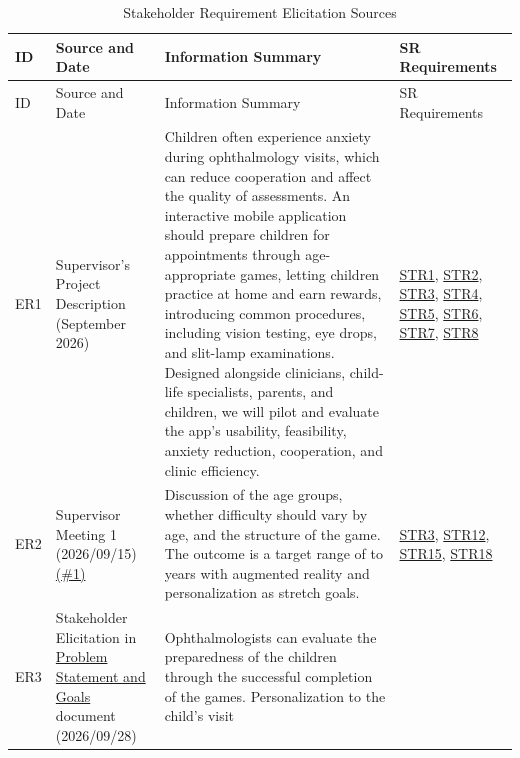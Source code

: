 \documentclass[12pt]{article}
\newcommand{\constref}[1]{%
    \hyperref[const:#1]{\texttt{\detokenize{#1}}}%
}
\begin{document}
\begin{longtable}{p{} >{\raggedright\arraybackslash}p{} >{\raggedright\arraybackslash}p{} >{\raggedright\arraybackslash}p{}}

\caption{Stakeholder Requirement Elicitation Sources}
\label{tab:SRESources}\\

\toprule
ID & Source and Date & Information Summary & SR Requirements \\
\midrule
\endfirsthead

\toprule
ID & Source and Date & Information Summary & SR Requirements \\
\midrule
\endhead

ER1\label{ER1}
& Supervisor's Project Description (September 2026)
& Children often experience anxiety during ophthalmology visits, 
which can reduce cooperation and affect the quality of assessments. 
An interactive mobile application should prepare children for 
appointments through age-appropriate games, letting children practice 
at home and earn rewards, introducing common procedures, including 
vision testing, eye drops, and slit-lamp examinations. Designed alongside 
clinicians, child-life specialists, parents, and children, we will pilot 
and evaluate the app's usability, feasibility, anxiety reduction, 
cooperation, and clinic efficiency.
& \hyperref[SR_Label1]{STR1}, \hyperref[SR_Label2]{STR2}, \hyperref[SR_Label3]{STR3}, 
\hyperref[SR_Label4]{STR4}, \hyperref[SR_Label5]{STR5}, \hyperref[SR_Label6]{STR6}, 
\hyperref[SR_Label7]{STR7}, \hyperref[SR_Label8]{STR8} \\
ER2\label{ER2}
& Supervisor Meeting 1 (2026/09/15) \href{https://github.com/team-hindsight/ophthamology-game/issues/1}{(\#1)}
& Discussion of the age groups, whether
difficulty should vary by age, and the
structure of the game. The outcome is a target range of 
\constref{MIN_AGE} to \constref{MAX_AGE} years with augmented 
reality and personalization as stretch goals.
& \hyperref[SR_Label3]{STR3}, \hyperref[SR_Label12]{STR12}, \hyperref[SR_Label15]{STR15}, 
\hyperref[SR_Label18]{STR18} \\
ER3\label{ER3}
& Stakeholder Elicitation in \href{https://team-hindsight.github.io/ophthamology-game/ProblemStatementAndGoals/ProblemStatement.pdf}{Problem Statement and Goals} document (2026/09/28)
& Ophthalmologists can evaluate the preparedness of the children through 
the successful completion of the games. Personalization to the child's visit 

\end{longtable}
\end{document}
